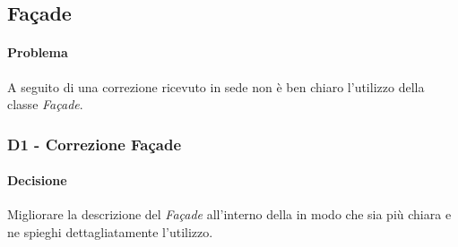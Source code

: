\subsection{Façade}\label{pFc}
\paragraph{Problema}
A seguito di una correzione ricevuto in sede \RQ non è ben chiaro l'utilizzo della classe \textit{Façade}.
\subsubsection{\textbf{D1} - Correzione Façade}\label{dFc}
\paragraph{Decisione}
Migliorare la descrizione del \textit{Façade} all'interno della \DP in modo che sia più chiara e ne spieghi dettagliatamente l'utilizzo.
